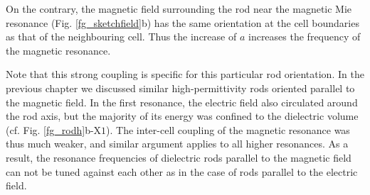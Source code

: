 On the contrary, the magnetic field surrounding the rod near the magnetic Mie resonance (Fig. \ref{fg_sketchfield}b) has the same orientation at the cell boundaries as that of the neighbouring cell. Thus the increase of $a$ increases the frequency of the magnetic resonance.

Note that this strong coupling is specific for this particular rod orientation. In the previous chapter we discussed similar high-permittivity rods oriented parallel to the magnetic field. In the first resonance, the electric field also circulated around the rod axis, but the majority of its energy was confined to the dielectric volume (cf. Fig.  \ref{fg_rodh}b-$\text{X}1$).  The inter-cell coupling of the magnetic resonance was thus much weaker, and similar argument applies to all higher resonances. As a result, the resonance frequencies of dielectric rods parallel to the magnetic field can not be tuned against each other as in the case of rods parallel to the electric field.

